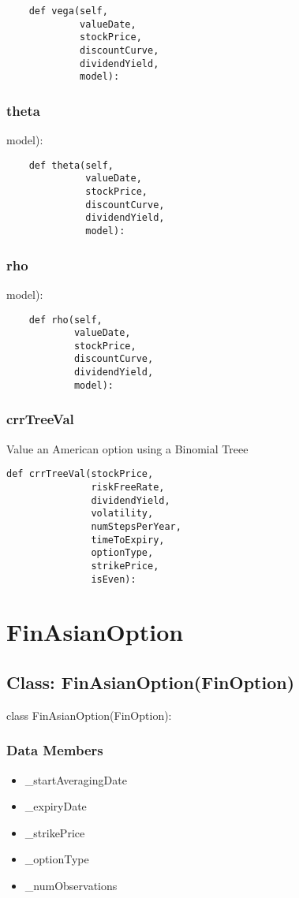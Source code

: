 \documentclass[twoside,11pt]{book}
\begin{document}
\begin{lstlisting}
    def vega(self,
             valueDate,
             stockPrice,
             discountCurve,
             dividendYield,
             model):
\end{lstlisting}

\subsubsection*{{\bf theta}}
model): 

\begin{lstlisting}
    def theta(self,
              valueDate,
              stockPrice,
              discountCurve,
              dividendYield,
              model):
\end{lstlisting}

\subsubsection*{{\bf rho}}
model): 

\begin{lstlisting}
    def rho(self,
            valueDate,
            stockPrice,
            discountCurve,
            dividendYield,
            model):
\end{lstlisting}

\subsubsection*{{\bf crrTreeVal}}
Value an American option using a Binomial Treee  

\begin{lstlisting}
def crrTreeVal(stockPrice,
               riskFreeRate,
               dividendYield,
               volatility,
               numStepsPerYear,
               timeToExpiry,
               optionType,
               strikePrice,
               isEven):
\end{lstlisting}

\newpage
\section{FinAsianOption}

\subsection*{Class: FinAsianOption(FinOption)}
class FinAsianOption(FinOption): 

\subsubsection*{Data Members}
\begin{itemize}
\item{\_startAveragingDate}
\item{\_expiryDate}
\item{\_strikePrice}
\item{\_optionType}
\item{\_numObservations}
\end{itemize}
\end{document}
